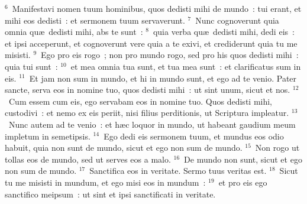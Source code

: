 ${}^{6}$~Manifestavi nomen tuum hominibus, quos dedisti mihi de mundo~: tui erant, et mihi eos dedisti~: et sermonem tuum servaverunt.
${}^{7}$~Nunc cognoverunt quia omnia qu\ae\ dedisti mihi, abs te sunt~:
${}^{8}$~quia verba qu\ae\ dedisti mihi, dedi eis~: et ipsi acceperunt, et cognoverunt vere quia a te exivi, et crediderunt quia tu me misisti.
${}^{9}$~Ego pro eis rogo~; non pro mundo rogo, sed pro his quos dedisti mihi~: quia tui sunt~:
${}^{10}$~et mea omnia tua sunt, et tua mea sunt~: et clarificatus sum in eis.
${}^{11}$~Et jam non sum in mundo, et hi in mundo sunt, et ego ad te venio. Pater sancte, serva eos in nomine tuo, quos dedisti mihi~: ut sint unum, sicut et nos.
${}^{12}$~Cum essem cum eis, ego servabam eos in nomine tuo. Quos dedisti mihi, custodivi~: et nemo ex eis periit, nisi filius perditionis, ut Scriptura impleatur.
${}^{13}$~Nunc autem ad te venio~: et h\ae c loquor in mundo, ut habeant gaudium meum impletum in semetipsis.
${}^{14}$~Ego dedi eis sermonem tuum, et mundus eos odio habuit, quia non sunt de mundo, sicut et ego non sum de mundo.
${}^{15}$~Non rogo ut tollas eos de mundo, sed ut serves eos a malo.
${}^{16}$~De mundo non sunt, sicut et ego non sum de mundo.
${}^{17}$~Sanctifica eos in veritate. Sermo tuus veritas est.
${}^{18}$~Sicut tu me misisti in mundum, et ego misi eos in mundum~:
${}^{19}$~et pro eis ego sanctifico meipsum~: ut sint et ipsi sanctificati in veritate.


